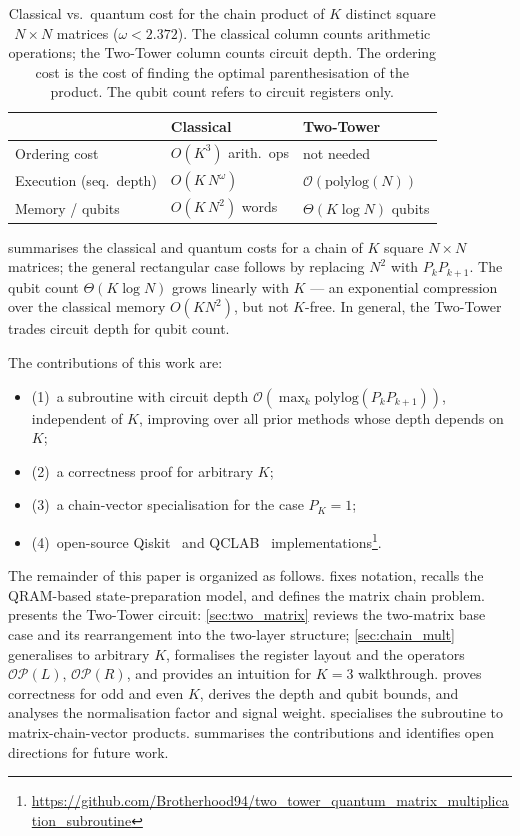\documentclass[a4paper,UKenglish,cleveref,autoref,thm-restate]{socg-lipics-v2021}
\newcommand{\OP}{\mathcal{OP}}        %
\begin{document}
\begin{table}[t]
  \caption{Classical vs.\ quantum cost for the chain product of $K$ distinct square $N \times N$ matrices ($\omega < 2.372$). The classical column counts arithmetic operations; the Two-Tower column counts circuit depth. The ordering cost is the cost of finding the optimal parenthesisation of the product. The qubit count refers to circuit registers only.}
  \label{tab:complexity}
  \centering
  \begin{tabular}{lll}
    \hline
    & \textbf{Classical} & \textbf{Two-Tower} \\
    \hline
    Ordering cost          & $O(K^3)$ arith.\ ops      & not needed \\
    Execution (seq.\ depth) & $O(K \, N^\omega)$      & $\mathcal{O}({\mathrm{ polylog}} (N))$ \\
    Memory / qubits        & $O(K \, N^2)$ words     & $\Theta(K \log N)$ qubits \\
    \hline
  \end{tabular}
\end{table}
 summarises the classical and quantum costs for a chain of $K$ square $N \times N$ matrices; the general rectangular case follows by replacing $N^2$ with $P_k P_{k+1}$. The qubit count $\Theta(K \log N)$ grows linearly with $K$ --- an exponential compression over the classical memory $O(K N^2)$, but not $K$-free. In general, the Two-Tower trades circuit depth for qubit count.

\smallskip
The contributions of this work are:
\begin{itemize}
\item (1)~a subroutine with circuit depth $\mathcal{O}(\max_k \mathrm{polylog}(P_k P_{k+1}))$, independent of $K$, improving over all prior methods whose depth depends on $K$;
\item (2)~a correctness proof for arbitrary $K$;
\item (3)~a chain-vector specialisation for the case $P_K = 1$;
\item (4)~open-source Qiskit~\cite{qiskit2024} and QCLAB~\cite{keip2025qclab} implementations\footnote{\url{https://github.com/Brotherhood94/two_tower_quantum_matrix_multiplication_subroutine}}.
\end{itemize}

The remainder of this paper is organized as follows.
 fixes notation, recalls the QRAM-based
state-preparation model, and defines the matrix chain problem.
 presents the Two-Tower circuit:
\cref{sec:two_matrix} reviews the two-matrix base case and its
rearrangement into the two-layer structure;
\cref{sec:chain_mult} generalises to arbitrary $K$, formalises the
register layout and the operators $\OP(L)$, $\OP(R)$, and provides an intuition for $K=3$ walkthrough.
 proves correctness for odd and even $K$,
derives the depth and qubit bounds, and analyses the normalisation
factor and signal weight.
 specialises the subroutine to matrix-chain-vector
products.
 summarises the contributions and
identifies open directions for future work.
\end{document}
